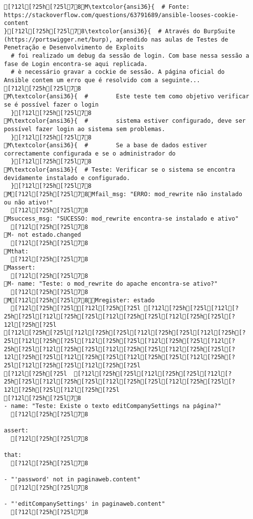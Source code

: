 \documentclass{scrartcl}
\begin{document}
\begin{Verbatim}
[?12l[?25h[?25l78M\textcolor{ansi36}{  # Fonte: https://stackoverflow.com/questions/63791689/ansible-looses-cookie-content
}[?12l[?25h[?25l78\textcolor{ansi36}{  # Através do BurpSuite (https://portswigger.net/burp), aprendido nas aulas de Testes de Penetração e Desenvolvimento de Exploits
  # foi realizado um debug da sessão de login. Com base nessa sessão a fase de Login encontra-se aqui replicada.
  # è necessário gravar a cockie de sessão. A página oficial do Ansible contem um erro que é resolvido com a seguinte...
[?12l[?25h[?25l78
M\textcolor{ansi36}{  #        Este teste tem como objetivo verificar se é possível fazer o login
  }[?12l[?25h[?25l78
M\textcolor{ansi36}{  #        sistema estiver configurado, deve ser possível fazer login ao sistema sem problemas.
  }[?12l[?25h[?25l78
M\textcolor{ansi36}{  #        Se a base de dados estiver correctamente configurada e se o administrador do
  }[?12l[?25h[?25l78
M\textcolor{ansi36}{  # Teste: Verificar se o sistema se encontra devidamente instalado e configurado.
  }[?12l[?25h[?25l78
M[?12l[?25h[?25l78Mfail_msg: "ERRO: mod_rewrite não instalado ou não ativo!"
  [?12l[?25h[?25l78
Msuccess_msg: "SUCESSO: mod_rewrite encontra-se instalado e ativo"
  [?12l[?25h[?25l78
M- not estado.changed
  [?12l[?25h[?25l78
Mthat:
  [?12l[?25h[?25l78
Massert:
  [?12l[?25h[?25l78
M- name: "Teste: o mod_rewrite do apache encontra-se ativo?"
  [?12l[?25h[?25l78
M[?12l[?25h[?25l78Mregister: estado
  [?12l[?25h[?25l[?12l[?25h[?25l [?12l[?25h[?25l[?12l[?25h[?25l[?12l[?25h[?25l[?12l[?25h[?25l[?12l[?25h[?25l[?12l[?25h[?25l
[?12l[?25h[?25l[?12l[?25h[?25l[?12l[?25h[?25l[?12l[?25h[?25l[?12l[?25h[?25l[?12l[?25h[?25l[?12l[?25h[?25l[?12l[?25h[?25l[?12l[?25h[?25l[?12l[?25h[?25l[?12l[?25h[?25l[?12l[?25h[?25l[?12l[?25h[?25l[?12l[?25h[?25l[?12l[?25h[?25l[?12l[?25h[?25l[?12l[?25h[?25l
[?12l[?25h[?25l  [?12l[?25h[?25l[?12l[?25h[?25l[?12l[?25h[?25l[?12l[?25h[?25l[?12l[?25h[?25l[?12l[?25h[?25l[?12l[?25h[?25l[?12l[?25h[?25l
[?12l[?25h[?25l78
- name: "Teste: Existe o texto editCompanySettings na página?"
  [?12l[?25h[?25l78

assert:
  [?12l[?25h[?25l78

that:
  [?12l[?25h[?25l78

- "'password' not in paginaweb.content"
  [?12l[?25h[?25l78

- "'editCompanySettings' in paginaweb.content"
  [?12l[?25h[?25l78


\end{Verbatim}
\end{document}
